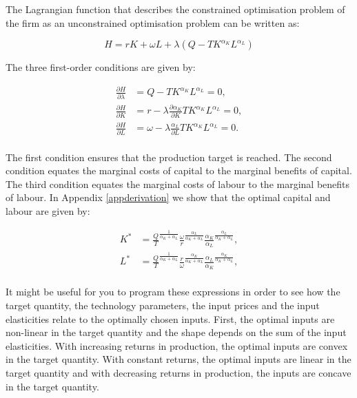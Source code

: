\documentclass[
]{book}
\begin{document}
The Lagrangian function that describes the constrained optimisation problem of the firm as an unconstrained optimisation problem can be written as:

\begin{equation}
H = rK+\omega L + \lambda (Q - TK^{\alpha_K}L^{\alpha_L})
\end{equation}

The three first-order conditions are given by:

\begin{align}
\frac{\partial H}{\partial \lambda} &=Q - TK^{\alpha_K}L^{\alpha_L} = 0,\\
\frac{\partial H}{\partial K} &= r - \lambda\frac{\partial \alpha_K}{\partial K}TK^{\alpha_K}L^{\alpha_L}= 0,\\
\frac{\partial H}{\partial L} &= \omega - \lambda\frac{\alpha_L}{\partial L}TK^{\alpha_K}L^{\alpha_L}= 0.\\
\end{align}

The first condition ensures that the production target is reached. The second condition equates the marginal costs of capital to the marginal benefits of capital. The third condition equates the marginal costs of labour to the marginal benefits of labour. In Appendix \ref{appderivation} we show that the optimal capital and labour are given by:

\begin{align}
K^\ast &= \frac{Q}{T}^{\frac{1}{\alpha_K+\alpha_L}}\frac{\omega}{r}^{\frac{\alpha_L}{\alpha_K+\alpha_L}}\frac{\alpha_K}{\alpha_L}^{\frac{\alpha_L}{\alpha_K+\alpha_L}},\\
L^\ast &= \frac{Q}{T}^{\frac{1}{\alpha_K+\alpha_L}}\frac{r}{\omega}^{\frac{\alpha_K}{\alpha_K+\alpha_L}}\frac{\alpha_L}{\alpha_K}^{\frac{\alpha_K}{\alpha_K+\alpha_L}},\\
\end{align}

It might be useful for you to program these expressions in order to see how the target quantity, the technology parameters, the input prices and the input elasticities relate to the optimally chosen inputs. First, the optimal inputs are non-linear in the target quantity and the shape depends on the sum of the input elasticities. With increasing returns in production, the optimal inputs are convex in the target quantity. With constant returns, the optimal inputs are linear in the target quantity and with decreasing returns in production, the inputs are concave in the target quantity.
\end{document}
